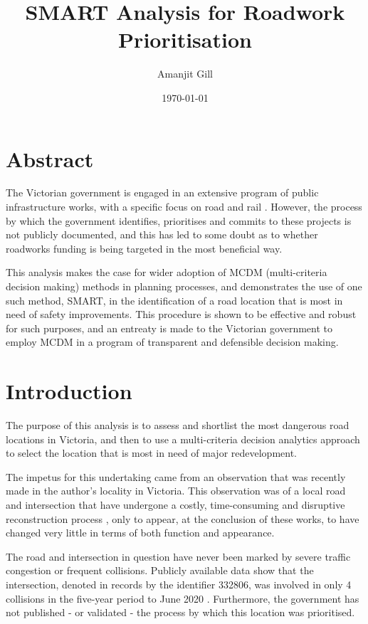 \documentclass[11pt, a4paper]{article}
\title{\Large\bfseries SMART Analysis for Roadwork Prioritisation}
\author{\large Amanjit Gill}
\date{\small \today}
\begin{document}
    
    \maketitle

    \section{Abstract}

    The Victorian government is engaged in an extensive program of public infrastructure works, with a specific focus on road and rail \parencite{a1}. However, the process by which the government identifies, prioritises and commits to these projects is not publicly documented, and this has led to some doubt as to whether roadworks funding is being targeted in the most beneficial way. 

    This analysis makes the case for wider adoption of MCDM (multi-criteria decision making) methods in planning processes, and demonstrates the use of one such method, SMART, in the identification of a road location that is most in need of safety improvements. This procedure is shown to be effective and robust for such purposes, and an entreaty is made to the Victorian government to employ MCDM in a program of transparent and defensible decision making.

    \section{Introduction}

    The purpose of this analysis is to assess and shortlist the most dangerous road locations in Victoria, and then to use a multi-criteria decision analytics approach to select the location that is most in need of major redevelopment.

    The impetus for this undertaking came from an observation that was recently made in the author's locality in Victoria. This observation was of a local road and intersection that have undergone a costly, time-consuming and disruptive reconstruction process \parencite{a2}, only to appear, at the conclusion of these works, to have changed very little in terms of both function and appearance.

    The road and intersection in question have never been marked by severe traffic congestion or frequent collisions. Publicly available data show that the intersection, denoted in records by the identifier 332806, was involved in only 4 collisions in the five-year period to June 2020 \parencite{a3}. Furthermore, the government has not published - or validated - the process by which this location was prioritised.
\end{document}

